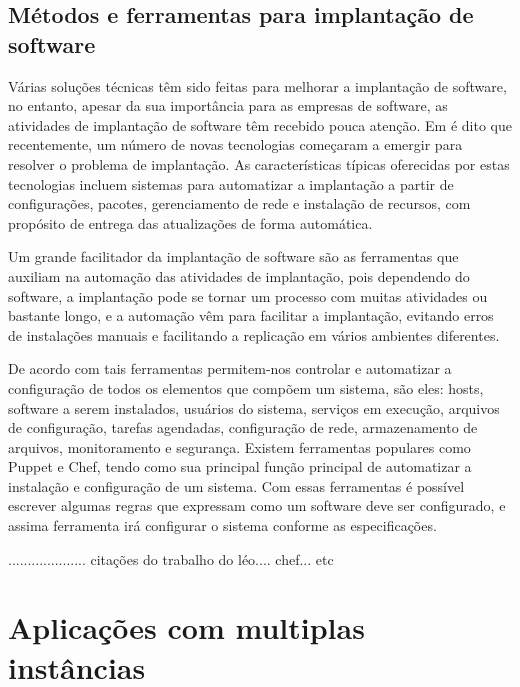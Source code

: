 \subsection{Métodos e ferramentas para implantação de software}
\label{subsec:metodoseferramentas}


Várias soluções técnicas têm sido feitas para melhorar a implantação de software,
\cite{5741269} no entanto, apesar da sua importância para as empresas de software, as atividades
de implantação de software têm recebido pouca atenção. Em \cite{deployment1998}
é dito que recentemente, um número de novas tecnologias começaram a emergir para
resolver o problema de implantação. As características típicas oferecidas por
estas tecnologias incluem sistemas para automatizar a implantação a partir de
configurações, pacotes, gerenciamento de rede e instalação de recursos, com
propósito de entrega das atualizações de forma automática.

Um grande facilitador da implantação de software são as ferramentas que auxiliam na
automação das atividades de implantação, pois dependendo do software, a implantação
pode se tornar um processo com muitas atividades ou bastante longo, e a automação
vêm para facilitar a implantação, evitando erros de instalações manuais e facilitando a replicação em
vários ambientes diferentes.

De acordo com  \cite{6265084} tais ferramentas permitem-nos controlar e automatizar
a configuração de todos os elementos que compõem um sistema, são eles: hosts, software a serem instalados,
usuários do sistema, serviços em execução, arquivos de configuração, tarefas agendadas,
configuração de rede, armazenamento de arquivos, monitoramento e segurança. Existem
ferramentas populares como Puppet e Chef, tendo como sua principal função principal
de automatizar a instalação e configuração de um sistema. Com essas ferramentas é
possível escrever algumas regras que expressam como um software deve ser configurado,
e assima ferramenta irá configurar o sistema conforme as especificações.


.................... citações do trabalho do léo.... chef... etc



\section{Aplicações com multiplas instâncias}
\label{cap-multiplas}

